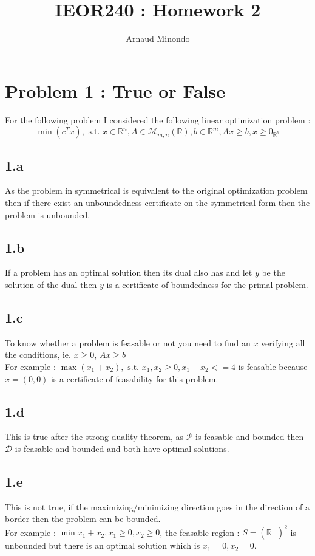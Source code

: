 \documentclass{article}
\title{IEOR240 : Homework 2}
\author{Arnaud Minondo}
\begin{document}
\maketitle
\section*{Problem 1 : True or False}
For the following problem I considered the following linear  optimization problem : 
\begin{equation}
    \min(c^Tx),  \text{ s.t. } x\in\mathbb{R}^n, A\in \mathcal{M}_{m,n}(\mathbb{R}), b\in\mathbb{R}^m, Ax \ge b, x\ge 0_{\mathbb{R}^n}
\end{equation}
\subsection*{1.a}
As the problem in symmetrical is equivalent to the original optimization problem then if there exist an unboundedness certificate on the symmetrical form then the problem is unbounded.
\subsection*{1.b}
If a problem has an optimal solution then its dual also has and let $y$ be the solution of the dual then $y$ is a certificate of boundedness for the primal problem.
\subsection*{1.c}
To know whether a problem is feasable or not you
 need to find an $x$ verifying all the conditions, 
 ie. $x\ge 0$, $Ax \ge b $
 \\
 For example :
 $\max (x_1+x_2), \text{ s.t. } x_1,x_2\ge 0, x_1+x_2<=4$ is feasable because 
 $x=(0,0)$ is a certificate of feasability for this problem.
\subsection*{1.d}
This is true after the strong duality theorem, as $\mathcal{P}$ is feasable and bounded then $\mathcal{D}$ is feasable and bounded and both have optimal solutions.

\subsection*{1.e}
This is not true, if the maximizing/minimizing direction goes in the direction of a border then the problem can be bounded.
\\
For example : $\min x_1+x_2, x_1\ge 0, x_2\ge 0$, the feasable region : $S = (\mathbb{R}^+)^2$ is unbounded but there is an optimal solution which is $x_1=0,x_2=0$.
\end{document}
